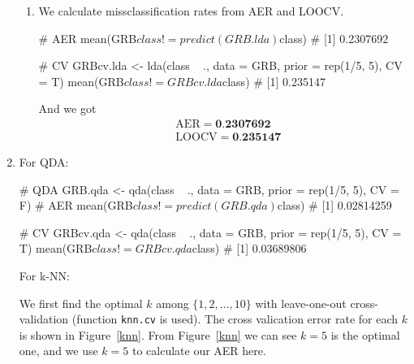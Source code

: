 \documentclass{article}
\begin{document}
\begin{enumerate}[leftmargin = 0 em, label = \arabic*., font = \bfseries]
\begin{enumerate}
	\item 
	We calculate missclassification rates from AER and LOOCV.
	\begin{rcode}
# AER
mean(GRB$class!=predict(GRB.lda)$class) 
# [1] 0.2307692

# CV
GRBcv.lda <- lda(class ~ ., data = GRB, prior = rep(1/5, 5), CV = T)
mean(GRB$class!= GRBcv.lda$class) 
# [1] 0.235147
	\end{rcode}
	And we got 
	\begin{align*}
	&\mathrm{AER} = \textbf{0.2307692}\\
	&\mathrm{LOOCV} = \textbf{0.235147}
	\end{align*}
	
\end{enumerate}

\item
For QDA:

\begin{rcode}
# QDA
GRB.qda <- qda(class ~ ., data = GRB, prior = rep(1/5, 5), CV = F)
# AER
mean(GRB$class!=predict(GRB.qda)$class) 
# [1] 0.02814259

# CV
GRBcv.qda <- qda(class ~ ., data = GRB, prior = rep(1/5, 5), CV = T)
mean(GRB$class!=GRBcv.qda$class) 
# [1] 0.03689806
\end{rcode}

For k-NN:

We first find the optimal $k$ among $\{1,2,\ldots, 10\}$ with leave-one-out cross-validation (function \verb|knn.cv| is used). The cross valication error rate for each $k$ is shown in Figure~\ref{knn}. From Figure~\ref{knn} we can see $k = 5$ is the optimal one, and we use $k = 5$ to calculate our AER here.
\end{enumerate}
\end{document}
